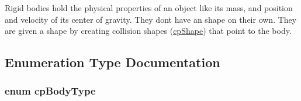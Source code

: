 Rigid bodies hold the physical properties of an object like it\textquotesingle{}s mass, and position and velocity of it\textquotesingle{}s center of gravity. They don\textquotesingle{}t have an shape on their own. They are given a shape by creating collision shapes (\hyperlink{structcp_shape}{cp\+Shape}) that point to the body. 

\subsection{Enumeration Type Documentation}
\hypertarget{group__cp_body_ga3581b128fd3e2734952aeac8545fd5ca}{}
\subsubsection[{cp\+Body\+Type}]{\setlength{\rightskip}{0pt plus 5cm}enum {\bf cp\+Body\+Type}}\label{group__cp_body_ga3581b128fd3e2734952aeac8545fd5ca}

